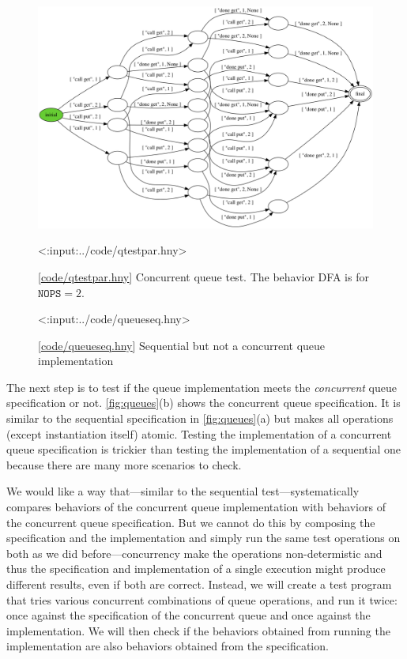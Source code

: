 \documentclass{report}
\newcommand{\harmonylink}[1]{%
[\href{https://harmony.cs.cornell.edu/#1}{\underline{#1}}]%
}
\newenvironment{code}{
\tcolorbox
}{
\endtcolorbox
}
\begin{document}
\begin{figure}
\begin{center}
\includegraphics[width=\textwidth]{figures/qtestpar.png}
\end{center}
\begin{code}
<{:input:../code/qtestpar.hny}>
\end{code}
\caption{\harmonylink{code/qtestpar.hny} Concurrent queue test.  The
behavior DFA is for $\mathtt{NOPS} = 2$.}
\label{fig:qtestpar}
\end{figure}

\begin{figure}
\begin{code}
<{:input:../code/queueseq.hny}>
\end{code}
\caption{\harmonylink{code/queueseq.hny} Sequential but not a concurrent
queue implementation}
\label{fig:queueseq}
\end{figure}

The next step is to test if the queue implementation
meets the \emph{concurrent} queue specification or not.
\autoref{fig:queues}(b) shows the concurrent queue specification.
It is similar to the sequential specification in \autoref{fig:queues}(a)
but makes all operations (except instantiation itself) atomic.
Testing the implementation of a concurrent queue specification is
trickier than testing the implementation of a sequential one because
there are many more scenarios to check.

We would like a way that---similar to the sequential test---systematically
compares behaviors of the
concurrent queue implementation with behaviors of the concurrent
queue specification.  But we cannot do this by composing the specification
and the implementation and simply run the same test operations on both as we
did before---concurrency make the operations non-determistic and thus
the specification and implementation of a single execution might produce
different results, even if both are correct.
Instead, we will create a test program that tries various concurrent
combinations of queue operations, and run it twice: once against the
specification of the concurrent queue and once against the
implementation.  We will then check if the behaviors obtained from
running the implementation are also behaviors obtained
from the specification.
\end{document}
